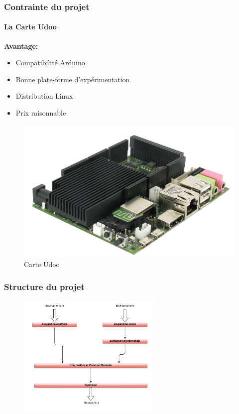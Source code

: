\documentclass{beamer}
\begin{document}
\begin{frame}
\frametitle{Contrainte du projet}
\framesubtitle{La Carte Udoo}
\begin{minipage}{0.49\textwidth}
\textbf{Avantage:}
\begin{itemize}
\item Compatibilité Arduino
\item Bonne plate-forme d’expérimentation
\item Distribution Linux
\item Prix raisonnable
\end{itemize}
\end{minipage}
\begin{minipage}{0.49\textwidth}
\begin{figure}
  \centering
  \includegraphics[width=\textwidth]{udoo.jpg} 
	\caption{Carte Udoo}
\end{figure}
\end{minipage}
\end{frame}

\begin{frame}
\frametitle{Structure du projet}
\begin{figure}
  \centering
  \includegraphics[height=220px]{structprojet.jpg} 
\end{figure}
\end{frame}
\end{document}
